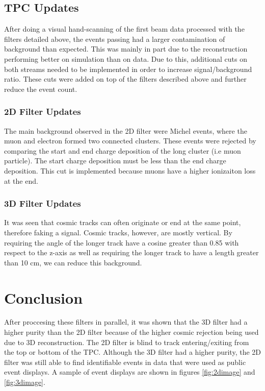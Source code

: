 \subsection{TPC Updates}
After doing a visual hand-scanning of the first beam data processed with the filters detailed above, the events passing had a larger contamination of background than expected. This was mainly in part due to the reconstruction performing better on simulation than on data. Due to this, additional cuts on both streams needed to be implemented in order to increase signal/background ratio. These cuts were added on top of the filters described above and further reduce the event count. 
\subsubsection{2D Filter Updates}
The main background observed in the 2D filter were Michel events, where the muon and electron formed two connected clusters. These events were rejected by comparing the start and end charge deposition of the long cluster (i.e muon particle). The start charge deposition must be less than the end charge deposition. This cut is implemented because muons have a higher ionizaiton loss at the end. 
\subsubsection{3D Filter Updates}
It was seen that cosmic tracks can often originate or end at the same point, therefore faking a signal. Cosmic tracks, however, are mostly vertical. By requiring the angle of the longer track have a cosine greater than 0.85 with respect to the z-axis as well as requiring the longer track to have a length greater than 10 cm, we can reduce this background. 
\section{Conclusion}
After proccesing these filters in parallel, it was shown that the 3D filter had a higher purity than the 2D filter because of the higher cosmic rejection being used due to 3D reconstruction. The 2D filter is blind to track entering/exiting from the top or bottom of the TPC. Although the 3D filter had a higher purity, the 2D filter was still able to find identifiable events in data that were used as public event displays. A sample of event displays are shown in figures \ref{fig:2dimage} and \ref{fig:3dimage}.

